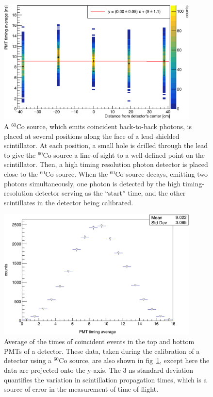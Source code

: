 \begin{figure}[H]
    \centering
    \includegraphics[width = 0.9\textwidth]{Content/Methods/CO60Validation.png}
    \caption{A $^{60}$Co source, which emits coincident back-to-back photons, is placed at several positions along the face of a lead shielded scintillator.
    At each position, a small hole is drilled through the lead to give the $^{60}$Co source a line-of-sight to a well-defined point on the scintillator.
    Then, a high timing resolution photon detector is placed close to the $^{60}$Co source.
    When the $^{60}$Co source decays, emitting two photons simultaneously, one photon is detected by the high timing-resolution detector serving as the ``start'' time, and the other scintillates in the detector being calibrated.}
    \label{fig:Co60Validation}
\end{figure}
\begin{figure}
    \centering
    \includegraphics[width = 0.9\textwidth]{Content/Methods/CO60ValidationProject.png}
    \caption{Average of the times of coincident events in the top and bottom PMTs of a detector.
    These data, taken during the calibration of a detector using a $^{60}$Co source, are also shown in fig~\ref{fig:Co60Validation}, except here the data are projected onto the y-axis.
    The 3 ns standard deviation quantifies the variation in scintillation propagation times, which is a source of error in the measurement of time of flight.}
    \label{fig:Co60ValidationProject}
\end{figure}
